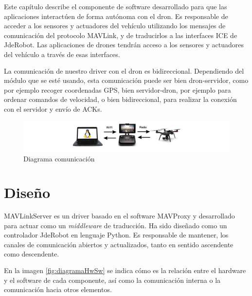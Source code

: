 Este capítulo describe el componente de software desarrollado para que las aplicaciones interactúen de forma autónoma con el dron. Es responsable de acceder a los sensores y actuadores del vehículo utilizando los mensajes de comunicación del protocolo MAVLink, y de traducirlos a las interfaces ICE de JdeRobot. Las aplicaciones de drones tendrán acceso a los sensores y actuadores del vehículo a través de esas interfaces.

La comunicación de nuestro driver con el dron es bidireccional. Dependiendo del módulo que se esté usando, esta comunicación puede ser bien dron-servidor, como por ejemplo recoger coordenadas GPS, bien servidor-dron, por ejemplo para ordenar comandos de velocidad, o bien bidireccional, para realizar la conexión con el servidor y envío de ACKs. 

\begin{figure}[H]
  \hspace*{-3.5cm}
  \includegraphics[scale=0.5]{imagenes/muySencillo.png}
  \caption{Diagrama comunicación}
  \label{fig:diagramaComunicacionServerDron1}
\end{figure}

\section{Diseño}
\label{Diseno}

MAVLinkServer es un driver basado en el software MAVProxy y desarrollado para actuar como un \textit{middleware} de traducción. Ha sido diseñado como un controlador JdeRobot en lenguaje Python. Es responsable de mantener, los canales de comunicación abiertos y actualizados, tanto en sentido ascendente como descendente. 

En la imagen \ref{fig:diagramaHwSw} se indica cómo es la relación entre el hardware y el software de cada componente, así como la comunicación interna o la comunicación hacia otros elementos.


